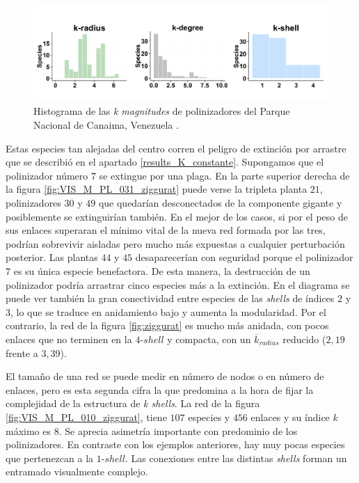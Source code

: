 \begin{figure}[ht!]
\centering
\includegraphics[scale=0.5]{Figures/VIS_M_PL_031_polar.png}
\caption {Histograma de las \textit{k magnitudes} de polinizadores del Parque Nacional de Canaima, Venezuela \cite{ramirez1989biologia}.}
\label{fig:VIS_M_PL_031_polar}
\end{figure}

Estas especies tan alejadas del centro corren el peligro de extinción por arrastre que se describió en el apartado \ref{results_K_constante}. Supongamos que el polinizador número $7$ se extingue por una plaga. En la parte superior derecha de la figura \ref{fig:VIS_M_PL_031_ziggurat} puede verse la tripleta planta $21$, polinizadores $30$ y $49$ que quedarían desconectados de la componente gigante y posiblemente se extinguirían también. En el mejor de los casos, si por el peso de sus enlaces superaran el mínimo vital de la nueva red formada por las tres, podrían sobrevivir aisladas pero mucho más expuestas a cualquier perturbación posterior. Las plantas $44$ y $45$ desaparecerían con seguridad porque el polinizador $7$ es su única especie benefactora. De esta manera, la destrucción de un polinizador podría arrastrar cinco especies más a la extinción. En el diagrama se puede ver también la gran conectividad entre especies de las \textit{shells} de índices $2$ y $3$, lo que se traduce en anidamiento bajo y aumenta la modularidad. Por el contrario, la red de la figura \ref{fig:ziggurat} es mucho más anidada, con pocos enlaces que no terminen en la $4$-$shell$ y compacta, con un $\overline k_{radius}$ reducido ($2,19$ frente a $3,39$).


El tamaño de una red se puede medir en número de nodos o en número de enlaces, pero es esta segunda cifra la que predomina a la hora de fijar la complejidad de la estructura de \textit{k shells}. La red de la figura \ref{fig:VIS_M_PL_010_ziggurat}, tiene $107$ especies y $456$ enlaces y su índice $k$ máximo es $8$. Se aprecia asimetría importante con predominio de los polinizadores. En contraste con los ejemplos anteriores, hay muy pocas especies que pertenezcan a la $1$-$shell$. Las conexiones entre las distintas \textit{shells} forman un entramado visualmente complejo.

